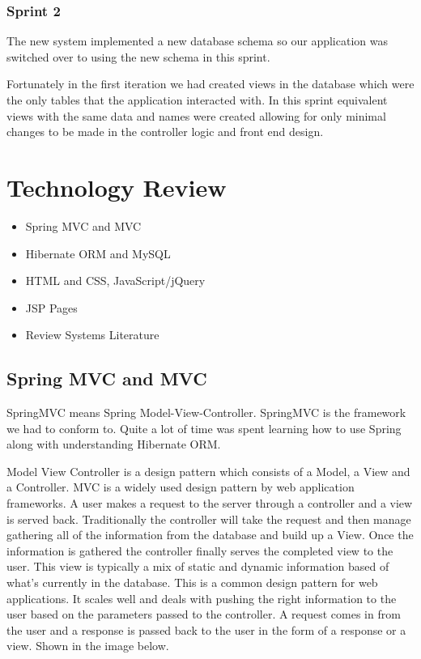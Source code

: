 \subsection{Sprint 2}
The new system implemented a new database schema so our application was switched over to using the new schema in this sprint. 

Fortunately in the first iteration we had created views in the database which were the only tables that the application interacted with. In this sprint equivalent views with the same data and names were created allowing for only minimal changes to be made in the controller logic and front end design.
 
\chapter{Technology Review}

\begin{itemize}	
	\item Spring MVC and MVC	
	\item Hibernate ORM and MySQL
	\item HTML and CSS, JavaScript/jQuery
	\item JSP Pages
	\item Review Systems Literature
\end{itemize}

\section{Spring MVC and MVC}

SpringMVC\cite{SpringMVC} means Spring Model-View-Controller. SpringMVC is the framework we had to conform to. Quite a lot of time was spent learning how to use Spring along with understanding Hibernate ORM.

Model View Controller is a design pattern which consists of a Model, a View and a Controller. MVC is a widely used design pattern by web application frameworks. A user makes a request to the server through a controller and a view is served back. Traditionally the controller will take the request and then manage gathering all of the information from the database and build up a View. Once the information is gathered the controller finally serves the completed view to the user. This view is typically a mix of static and dynamic information based of what's currently in the database. This is a common design pattern for web applications. It scales well and deals with pushing the right information to the user based on the parameters passed to the controller. A request comes in from the user and a response is passed back to the user in the form of a response or a view. Shown in the image below.

